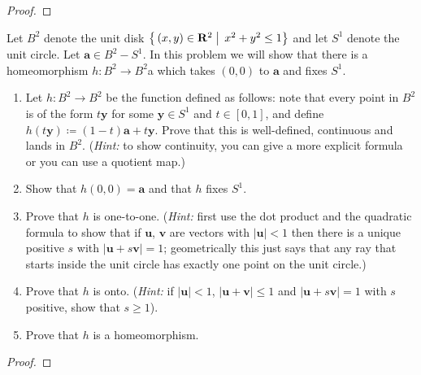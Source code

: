 \begin{proof}
\end{proof}
\newpage
\begin{problem}
Let $B^2$ denote the unit disk
$\left\{\,(x,y)\in\mathbf{R}^2\;\middle|\;\,x^2+y^2\leq 1\right\}$ and
let $S^1$ denote the unit circle. Let $\mathbf{a}\in B^2-S^1$. In
this problem we will show that there is a homeomorphism $h\colon
B^2\to B^2$a which takes $(0,0)$ to $\mathbf{a}$ and fixes $S^1$.
\begin{enumerate}[label=(\roman*)]
\item Let $h\colon B^2\to B^2$ be the function defined as
  follows: note that every point in $B^2$ is of the form
  $t\mathbf{y}$ for some $\mathbf{y}\in S^1$ and $t\in[0,1]$, and
  define
  $h(t\mathbf{y})\coloneqq(1-t)\mathbf{a}+t\mathbf{y}$. Prove
  that this is well-defined, continuous and lands in
  $B^2$. (\emph{Hint:} to show continuity, you can give a more
  explicit formula or you can use a quotient map.)
\item Show that $h(0,0)=\mathbf{a}$ and that $h$ fixes $S^1$.
\item Prove that $h$ is one-to-one. (\emph{Hint:} first use the
  dot product and the quadratic formula to show that if
  $\mathbf{u}$, $\mathbf{v}$ are vectors with $|\mathbf{u}|<1$
  then there is a unique positive $s$ with
  $|\mathbf{u}+s\mathbf{v}|=1$; geometrically this just says that
  any ray that starts inside the unit circle has exactly one
  point on the unit circle.)
\item Prove that $h$ is onto. (\emph{Hint:} if $|\mathbf{u}|<1$,
  $|\mathbf{u}+\mathbf{v}|\leq 1$ and
  $|\mathbf{u}+s\mathbf{v}|=1$ with $s$ positive, show that
  $s\geq 1$).
\item Prove that $h$ is a homeomorphism.
\end{enumerate}
\end{problem}
\begin{proof}
\end{proof}

